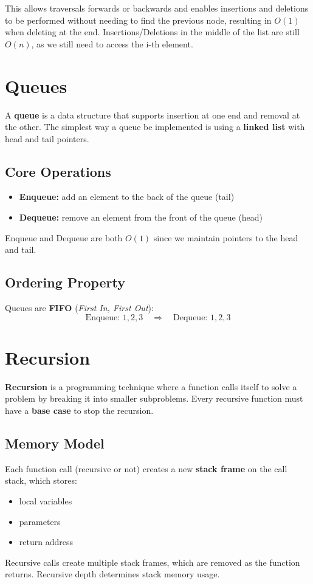 \documentclass{article}
\begin{document}
This allows traversals forwards or backwards and enables insertions and deletions to be performed without needing to find the previous node, resulting in $O(1)$ when deleting at the end. Insertions/Deletions in the middle of the list are still $O(n)$, as we still need to access the i-th element.

\section{Queues}

A \textbf{queue} is a data structure that supports insertion at one end and removal at the other.  
The simplest way a queue be implemented is using a \textbf{linked list} with head and tail pointers.

\subsection{Core Operations}
\begin{itemize}
  \item \textbf{Enqueue:} add an element to the back of the queue (tail)
  \item \textbf{Dequeue:} remove an element from the front of the queue (head)
\end{itemize}
Enqueue and Dequeue are both \textbf{$O(1)$} since we maintain pointers to the head and tail.

\subsection{Ordering Property}
Queues are \textbf{FIFO} (\textit{First In, First Out}):
\[
\text{Enqueue: } 1,2,3 \quad \Rightarrow \quad \text{Dequeue: } 1,2,3
\]

\section{Recursion}

\textbf{Recursion} is a programming technique where a function calls itself to solve a problem by breaking it into smaller subproblems.  
Every recursive function must have a \textbf{base case} to stop the recursion.

\subsection{Memory Model}
Each function call (recursive or not) creates a new \textbf{stack frame} on the call stack, which stores:
\begin{itemize}
  \item local variables
  \item parameters
  \item return address
\end{itemize}
Recursive calls create multiple stack frames, which are removed as the function returns. Recursive depth determines stack memory usage.
\end{document}
